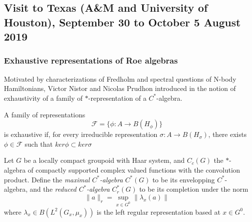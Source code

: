 \newpage
\subsection{Visit to Texas (A\&M and University of Houston), September 30 to October 5 August 2019}

\subsubsection*{Exhaustive representations of Roe algebras}

Motivated by characterizations of Fredholm and spectral questions of N-body Hamiltonians, Victor Nistor and Nicolas Prudhon introduced in \cite{nistor2014exhausting} the notion of exhaustivity of a family of $*$-representation of a $C^*$-algebra.

\begin{definition}
A family of representations  
\[\mathcal F = \{\phi : A \rightarrow B(H_\phi)\}\]
is exhaustive if, for every irreducible representation $\sigma : A \rightarrow B(H_\sigma)$, there exists $\phi\in \mathcal F$ such that $ker \phi \subset ker \sigma$
\end{definition}

Let $G$ be a locally compact groupoid with Haar system, and $C_c(G)$ the $*$-algebra of compactly supported complex valued functions with the convolution product. Define the \textit{maximal $C^*$-algebra} $C^*(G)$ to be its envelopping $C^*$-algebra, and the \textit{reduced $C^*$-algebra} $C^*_r(G)$ to be its completion under the norm 
\[\|a\|_r = \sup_{x\in G^0} \|\lambda_x(a)\| \]
where $\lambda_x\in B(L^2(G_x, \mu_x))$ is the left regular representation based at $x\in G^0$.\\

